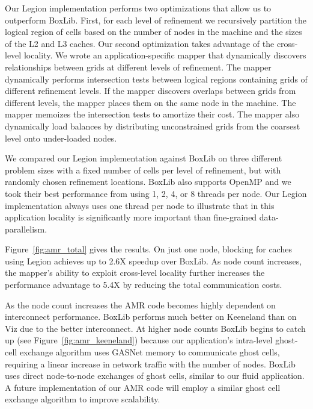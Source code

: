 Our Legion implementation performs two optimizations that allow us to
outperform BoxLib.  First, for each level of
refinement we recursively partition the logical region of cells based
on the number of nodes in the machine and the sizes of the L2 and L3 caches.
Our second optimization takes advantage of the cross-level locality.
We wrote an application-specific mapper that dynamically discovers
relationships between grids at different levels of refinement.  The
mapper dynamically performs intersection tests between logical regions
containing grids of different refinement levels.  If the mapper
discovers overlaps between grids from different levels, the mapper
places them on the same node in the machine.  The
mapper memoizes the intersection tests to amortize their cost.  The
mapper also dynamically load balances by distributing unconstrained
grids from the coarsest level onto under-loaded nodes.

We compared our Legion implementation against BoxLib on three
different problem sizes with a fixed number of cells per level of
refinement, but with randomly chosen refinement locations.  BoxLib
also supports OpenMP and we took their best performance from using 1,
2, 4, or 8 threads per node.  Our Legion implementation always uses
one thread per node to illustrate that in this application locality is
significantly more important than fine-grained data-parallelism.  

Figure~\ref{fig:amr_total} gives the results.
On just one node, blocking for caches using Legion achieves up to 2.6X
speedup over BoxLib.  As node count increases, the mapper's
ability to exploit cross-level locality further increases
the performance advantage to 5.4X by reducing the total
communication costs.

As the node count increases the AMR code becomes highly dependent on
interconnect performance.  BoxLib performs much better on Keeneland
than on Viz due to the better interconnect.  
At higher node counts BoxLib
begins to catch up (see Figure~\ref{fig:amr_keeneland})
because our application's intra-level ghost-cell exchange algorithm
uses GASNet memory to communicate ghost cells, requiring a
linear increase in network traffic with the number of nodes.  BoxLib
uses direct node-to-node exchanges of ghost cells, similar to
our fluid application.  A future implementation of our AMR code will
employ a similar ghost cell exchange algorithm to improve scalability.

